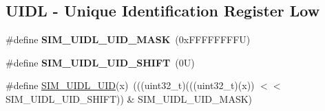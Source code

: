 \subsection*{U\+I\+DL -\/ Unique Identification Register Low}
\begin{DoxyCompactItemize}
\item 
\mbox{\label{group___s_i_m___register___masks_ga412340eabbcd0f0d48ce4886e9beb071}} 
\#define {\bfseries S\+I\+M\+\_\+\+U\+I\+D\+L\+\_\+\+U\+I\+D\+\_\+\+M\+A\+SK}~(0x\+F\+F\+F\+F\+F\+F\+F\+F\+U)
\item 
\mbox{\label{group___s_i_m___register___masks_ga6fb1383717ebfa6f47b5a5952fd21d63}} 
\#define {\bfseries S\+I\+M\+\_\+\+U\+I\+D\+L\+\_\+\+U\+I\+D\+\_\+\+S\+H\+I\+FT}~(0\+U)
\item 
\#define \mbox{\hyperlink{group___s_i_m___register___masks_ga636c37811a4a8c9a57df79fd1790b800}{S\+I\+M\+\_\+\+U\+I\+D\+L\+\_\+\+U\+ID}}(x)~(((uint32\+\_\+t)(((uint32\+\_\+t)(x)) $<$$<$ S\+I\+M\+\_\+\+U\+I\+D\+L\+\_\+\+U\+I\+D\+\_\+\+S\+H\+I\+FT)) \& S\+I\+M\+\_\+\+U\+I\+D\+L\+\_\+\+U\+I\+D\+\_\+\+M\+A\+SK)
\end{DoxyCompactItemize}
